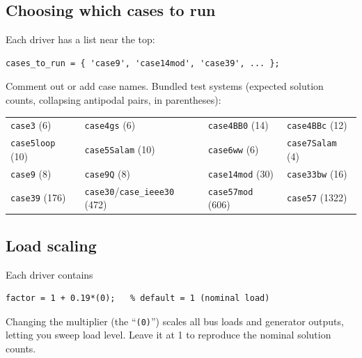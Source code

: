 \documentclass[11pt,a4paper]{article}
\newcommand{\code}[1]{\texttt{#1}}
\begin{document}
\subsection{Choosing which cases to run}
Each driver has a list near the top:
\begin{lstlisting}[style=mat]
cases_to_run = { 'case9', 'case14mod', 'case39', ... };
\end{lstlisting}
Comment out or add case names. Bundled test systems (expected solution counts, collapsing
antipodal pairs, in parentheses):

\begin{center}\small
\begin{tabular}{@{}llll@{}}
\toprule
\code{case3} (6) & \code{case4gs} (6) & \code{case4BB0} (14) & \code{case4BBc} (12)\\
\code{case5loop} (10) & \code{case5Salam} (10) & \code{case6ww} (6) & \code{case7Salam} (4)\\
\code{case9} (8) & \code{case9Q} (8) & \code{case14mod} (30) & \code{case33bw} (16)\\
\code{case39} (176) & \code{case30}/\code{case_ieee30} (472) & \code{case57mod} (606) & \code{case57} (1322)\\
\bottomrule
\end{tabular}
\end{center}

\subsection{Load scaling}
Each driver contains
\begin{lstlisting}[style=mat]
factor = 1 + 0.19*(0);   % default = 1 (nominal load)
\end{lstlisting}
Changing the multiplier (the ``\code{(0)}'') scales all bus loads and generator outputs,
letting you sweep load level. Leave it at 1 to reproduce the nominal solution counts.
\end{document}
